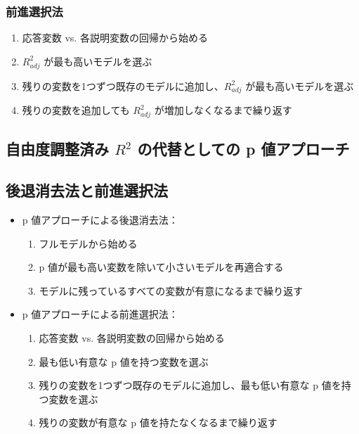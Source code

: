 
\begin{frame}
\frametitle{前進選択法}

\begin{enumerate}

\item 応答変数 vs. 各説明変数の回帰から始める
\item $R^2_{adj}$ が最も高いモデルを選ぶ
\item 残りの変数を1つずつ既存のモデルに追加し、$R^2_{adj}$ が最も高いモデルを選ぶ
\item 残りの変数を追加しても $R^2_{adj}$ が増加しなくなるまで繰り返す

\end{enumerate}

\end{frame}


\subsection{自由度調整済み $R^2$ の代替としての p 値アプローチ}


\begin{frame}
\subsection{後退消去法と前進選択法}

\begin{itemize}

\item p 値アプローチによる後退消去法：
\begin{enumerate}
\item フルモデルから始める
\item p 値が最も高い変数を除いて小さいモデルを再適合する
\item モデルに残っているすべての変数が有意になるまで繰り返す
\end{enumerate}

\item p 値アプローチによる前進選択法：
\begin{enumerate}
\item 応答変数 vs. 各説明変数の回帰から始める
\item 最も低い有意な p 値を持つ変数を選ぶ
\item 残りの変数を1つずつ既存のモデルに追加し、最も低い有意な p 値を持つ変数を選ぶ
\item 残りの変数が有意な p 値を持たなくなるまで繰り返す
\end{enumerate}

\end{itemize}

\end{frame}

